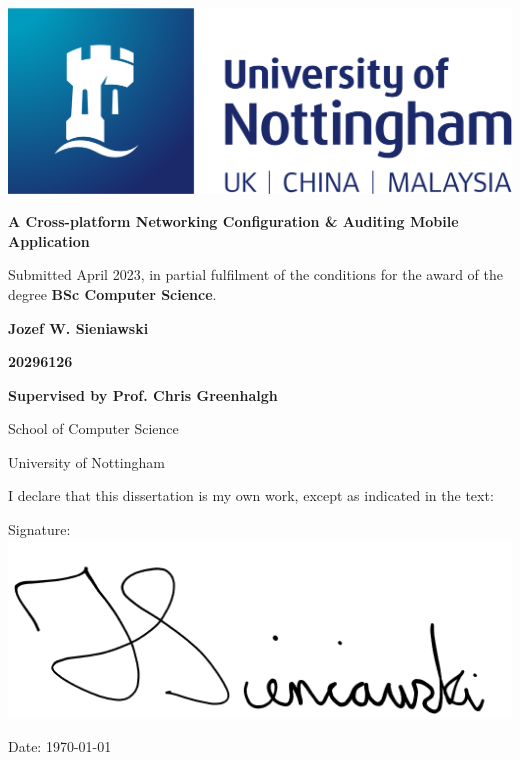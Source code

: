 \documentclass [11pt,a4paper]{article}
\begin{document}
 
\thispagestyle{empty}
\begin{center}
    \centering
    \includegraphics[width=0.5\linewidth]{images/nottingham-logo.png}
    \vspace{2.5cm}
    {\Large \par}
    {\LARGE \textbf{A Cross-platform Networking Configuration \& Auditing Mobile Application}\par}
    \vspace{1.5cm}
    {\small Submitted April 2023, in partial fulfilment of \break the conditions for the award of the degree \textbf{BSc Computer Science}.\par}

    \vspace{1cm}
    {\Large \textbf{Jozef W. Sieniawski}\par}
    {\textbf{20296126}\par}
    \vspace{1cm}
    {\normalsize \textbf{Supervised by Prof. Chris Greenhalgh}\par}
    \vspace{1cm}
    {\normalsize School of Computer Science\par}
    {\normalsize University of Nottingham\par}
    \vspace{2cm}

    {\normalsize I declare that this dissertation is my own work, except as indicated in the text:\par}
    \vspace{1cm}
    {\normalsize Signature: \underline{ \includegraphics[width=0.25\linewidth]{images/signature.png}}\par}
    \vspace{0.25cm}
    {\normalsize Date: \today\par}
\end{center}

\pagebreak
{}
\end{document}

